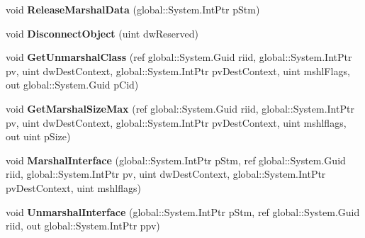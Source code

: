 \begin{DoxyCompactItemize}
void {\bfseries Release\+Marshal\+Data} (global\+::\+System.\+Int\+Ptr p\+Stm)
\item 
\mbox{\label{interface_system_1_1_runtime_1_1_interop_services_1_1_i_marshal_____system___runtime___windows_runtime_a6c9ed45c61839a823eaeb6e035dd2e25}} 
void {\bfseries Disconnect\+Object} (uint dw\+Reserved)
\item 
\mbox{\label{interface_system_1_1_runtime_1_1_interop_services_1_1_i_marshal_____system___runtime___windows_runtime_ac0f4d724dea939dbf088fe46a53dec1a}} 
void {\bfseries Get\+Unmarshal\+Class} (ref global\+::\+System.\+Guid riid, global\+::\+System.\+Int\+Ptr pv, uint dw\+Dest\+Context, global\+::\+System.\+Int\+Ptr pv\+Dest\+Context, uint mshl\+Flags, out global\+::\+System.\+Guid p\+Cid)
\item 
\mbox{\label{interface_system_1_1_runtime_1_1_interop_services_1_1_i_marshal_____system___runtime___windows_runtime_a79af4aa5ca6d5a68217437912f3c9333}} 
void {\bfseries Get\+Marshal\+Size\+Max} (ref global\+::\+System.\+Guid riid, global\+::\+System.\+Int\+Ptr pv, uint dw\+Dest\+Context, global\+::\+System.\+Int\+Ptr pv\+Dest\+Context, uint mshlflags, out uint p\+Size)
\item 
\mbox{\label{interface_system_1_1_runtime_1_1_interop_services_1_1_i_marshal_____system___runtime___windows_runtime_a8598188070b1e46f9ba750c61433e126}} 
void {\bfseries Marshal\+Interface} (global\+::\+System.\+Int\+Ptr p\+Stm, ref global\+::\+System.\+Guid riid, global\+::\+System.\+Int\+Ptr pv, uint dw\+Dest\+Context, global\+::\+System.\+Int\+Ptr pv\+Dest\+Context, uint mshlflags)
\item 
\mbox{\label{interface_system_1_1_runtime_1_1_interop_services_1_1_i_marshal_____system___runtime___windows_runtime_a3e8bcee1d02a9ee6b7ef2e3996b54765}} 
void {\bfseries Unmarshal\+Interface} (global\+::\+System.\+Int\+Ptr p\+Stm, ref global\+::\+System.\+Guid riid, out global\+::\+System.\+Int\+Ptr ppv)

\end{DoxyCompactItemize}
